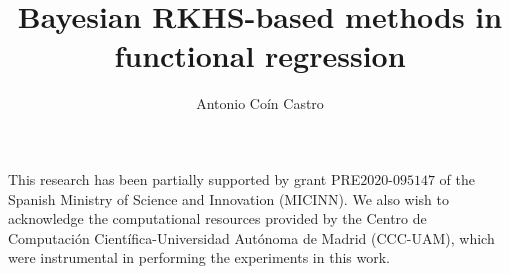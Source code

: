 \documentclass{mimosis}
\title{\textbf{Bayesian RKHS-based methods in functional regression}}
\author{Antonio Coín Castro}
\newcommand{\thesisPath}{chapters}
\newcommand{\titlecolor}{teal}
\renewcommand*{\chapterformat}{%
  \fontsize{60}{65}\selectfont\color{\titlecolor}\(\thechapter\)\autodot\enskip
}
\theoremstyle{theorem}
\theoremstyle{definition}
\theoremstyle{remark}
\begin{document}
\frontmatter
  
  

  \vspace*{-1.8cm}
  \tableofcontents

\mainmatter









\appendix

\renewcommand*{\chapterformat}{%
  \fontsize{60}{65}\selectfont\color{\titlecolor}\thechapter\autodot\enskip
}





\backmatter

\printbibliography

\begin{center}
\vspace{.25em}
\color{teal}\FourStar
\end{center}

\begin{small}
This research has been partially supported by grant PRE\(2020\)-\(095147\) of the Spanish Ministry of Science and Innovation (MICINN). We also wish to acknowledge the computational resources provided by the Centro de Computación Científica-Universidad Autónoma de Madrid (CCC-UAM), which were instrumental in performing the experiments in this work.
\end{small}
\end{document}
